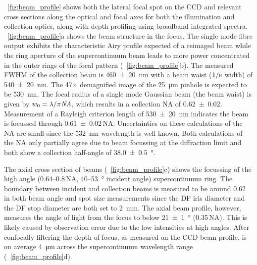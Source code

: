 \documentclass{article}
\begin{document}
\figurename~\ref{fig:beam_profile} shows both the lateral focal spot on the CCD and relevant cross sections along the optical and focal axes for both the illumination and collection optics, along with depth-profiling using broadband-integrated spectra. \figurename~\ref{fig:beam_profile}a shows the beam structure in the focus.  The single mode fibre output exhibits the characteristic Airy profile expected of a reimaged beam while the ring aperture of the supercontinuum beam leads to more power concentrated in the outer rings of the focal pattern (\figurename~\ref{fig:beam_profile}b). The measured FWHM of the collection beam is \SI{460\pm20}{nm} with a beam waist ($1/\mathrm{e}$ width) of \SI{540\pm20}{nm}. The 47$\times$ demagnified image of the \SI{25}{\micro\metre} pinhole is expected to be \SI{530}{nm}. The focal radius of a single mode Gaussian beam  (the beam waist) is given by $w_0 = \lambda/\pi\mathit{NA}$, which results in a collection NA of \num{0.62\pm0.02}. Measurement of a Rayleigh criterion length of \SI{530\pm20}{nm} indicates the beam is focussed through \num{0.61\pm0.02}\,NA. Uncertainties on these calculations of the NA are small since the \SI{532}{nm} wavelength is well known. Both calculations of the NA only partially agree due to beam focussing at the diffraction limit and both show a collection half-angle of \SI{38.0\pm0.5}{\degree}.


The axial cross section of beams (\figurename~\ref{fig:beam_profile}c) shows the focussing of the high angle (0.64--0.8\,NA, 40--\SI{53}{\degree} incident angle) supercontinuum ring. The boundary between incident and collection beams is measured to be around 0.62 in both beam angle and spot size measurements since the DF iris diameter and the DF stop diameter are both set to \SI{2}{mm}. The axial beam profile, however, measures the angle of light from the focus to below \SI{21\pm1}{\degree} (0.35\,NA). This is likely caused by observation error due to the low intensities at high angles. After confocally filtering the depth of focus, as measured on the CCD beam profile, is on average \SI{4}{\micro\metre} across the supercontinuum wavelength range (\figurename~\ref{fig:beam_profile}d).
\end{document}
